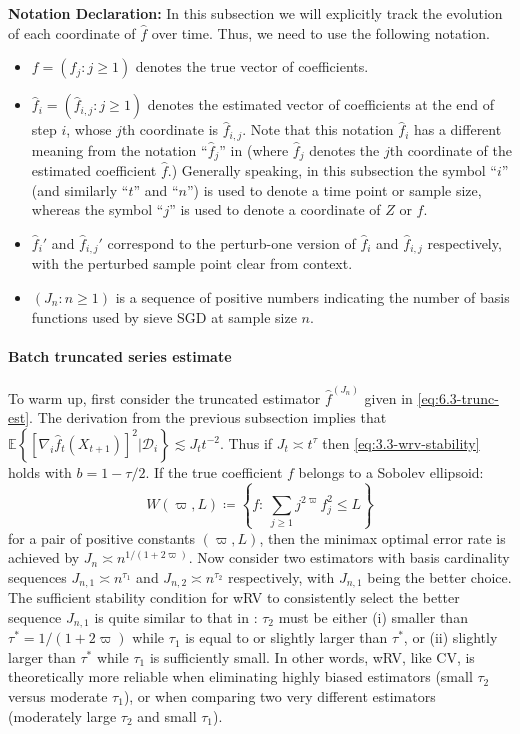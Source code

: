\documentclass[11pt]{article}
\theoremstyle{plain}
\newcommand{\D}{{\mathcal{D}}}
\begin{document}
\textbf{Notation Declaration:} In this subsection we will explicitly track the evolution of each coordinate of $\hat f$ over time.  Thus, we need to use the following notation.
\begin{itemize}
    \item $f=(f_j:j\ge 1)$ denotes the true vector of coefficients.
    \item $\hat f_i = (\hat f_{i,j}:j\ge 1)$ denotes the estimated vector of coefficients at the end of step $i$, whose $j$th coordinate is $\hat f_{i,j}$. Note that this notation $\hat f_i$ has a different meaning from the notation ``$\hat f_j$'' in  (where $\hat f_j$ denotes the $j$th coordinate of the estimated coefficient $\hat f$.)  Generally speaking, in this subsection the symbol ``$i$'' (and similarly ``$t$'' and ``$n$'') is used to denote a time point or sample size, whereas the symbol ``$j$'' is used to denote a coordinate of $Z$ or $f$.
    \item $\hat f_i'$ and $\hat f_{i,j}'$ correspond to the perturb-one version of $\hat f_i$ and $\hat f_{i,j}$ respectively, with the perturbed sample point clear from context.
    \item $(J_n:n\ge 1)$ is a sequence of positive numbers indicating the number of basis functions used by sieve SGD at sample size $n$. 
\end{itemize}

\paragraph{Batch truncated series estimate}
To warm up, 
first consider the truncated estimator $\hat f^{(J_n)}$ given in \eqref{eq:6.3-trunc-est}. The derivation from the previous subsection implies that 
$\mathbb E\left\{[\nabla_i\hat f_t(X_{t+1})]^2|\D_i\right\}\lesssim J_t t^{-2}$. Thus if $J_t\asymp t^{\tau}$ then \eqref{eq:3.3-wrv-stability} holds with $b=1-\tau/2$. If the true coefficient $f$ belongs to a Sobolev ellipsoid:
\begin{equation}\label{eq:6.4-sobo}
W(\varpi,L)\coloneqq\left\{f:~\sum_{j\ge 1}j^{2\varpi}f_j^2 \le L\right\}    
\end{equation}
for a pair of positive constants $(\varpi,L)$, then the minimax optimal error rate is achieved by $J_n\asymp n^{1/(1+2\varpi)}$.  Now consider two estimators with basis cardinality sequences $J_{n,1}\asymp n^{\tau_1}$ and $J_{n,2}\asymp n^{\tau_2}$ respectively, with $J_{n,1}$ being the better choice.   The sufficient stability condition for wRV to consistently select the better sequence $J_{n,1}$ is quite similar to that in : $\tau_2$ must be either (i) smaller than $\tau^*=1/(1+2\varpi)$ while $\tau_1$ is equal to or slightly larger than $\tau^*$, 
or (ii) slightly larger than $\tau^*$ while $\tau_1$ is sufficiently small.  In other words, wRV, like CV, is theoretically more reliable when eliminating highly biased estimators (small $\tau_2$ versus moderate $\tau_1$), or when comparing two very different estimators (moderately large $\tau_2$ and small $\tau_1$).
\end{document}

